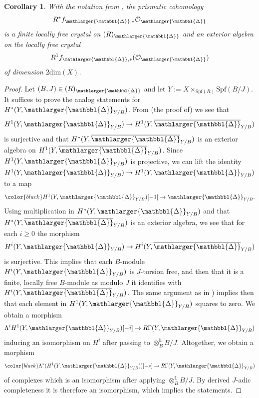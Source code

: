 \documentclass{amsart}
\newcommand{\prism}{{\mathlarger{\mathbbl{\Delta}}}}
\theoremstyle{plain}
\newtheorem{corollary}[theorem]{Corollary}
\theoremstyle{definition}
\newcommand{\Spf}{\mathrm{Spf}}
\newcommand{\red}[1]{{\color{black} #1}}
\newcommand{\blue}[1]{{\color{black}#1}}
\begin{document}
\begin{corollary}
  \label{sec:prism-dieud-modul-corollary-prismatic-cohomology-of-abelian-schemes} With the notation from ,
  the prismatic cohomology
  $$
  R^\ast f_{\prism,\ast}\mathcal{O}_\prism
  $$
  is a finite locally free crystal on $(R)_\prism$ and an exterior algebra on the locally free crystal
  $$
R^1f_{\prism,\ast}(\mathcal{O}_\prism)
$$
of dimension $2\mathrm{dim}(X)$.
  
\end{corollary}
\begin{proof}
  Let $(B,J)\in (R)_\prism$ and let $Y:=X\times_{\Spf(R)}\Spf(B/J)$. It suffices to prove the analog statements for $H^\ast(Y,\prism_{Y/B})$.
  From (the proof of)  we see that
  $$
  H^1(Y,\prism_{Y/B})\to H^1(Y,\overline{\prism}_{Y/B})
  $$
  is surjective and that $H^\ast(Y,\overline{\prism}_{Y/B})$ is an exterior algebra on $H^1(Y,\overline{\prism}_{Y/B})$. \blue{Since $H^1(Y,\prism_{Y/B})$ is projective, we can lift the identity $H^1(Y,\prism_{Y/B}) \to H^1(Y,\prism_{Y/B})$ to a map}
  $$
  \blue{H^1(Y,\prism_{Y/B})}[-1]\to \prism_{Y/B}.
  $$
  \red{Using multiplication in $H^\ast(Y,\prism_{Y/B})$ and that $H^\ast(Y,\overline{\prism}_{Y/B})$ is an exterior algebra, we see that for each $i\geq 0$ the morphism
    \[
      H^i(Y,\prism_{Y/B})\to H^i(Y,\overline{\prism}_{Y/B})
    \]
  is surjective. This implies that each $B$-module $H^i(Y,\prism_{Y/B})$ is $J$-torsion free, and then that it is a finite, locally free $B$-module as modulo $J$ it identifies with $H^i(Y,\overline{\prism}_{Y/B})$. The same argument \blue{as in \cite[Proposition 2.5.2.(ii)]{berthelot_breen_messing_theorie_de_dieudonne_cristalline_II})} implies then that each element in $H^1(Y,\prism_{Y/B})$ squares to zero.} \blue{We obtain a morphism
  $$
  \Lambda^i{H^1(Y,\prism_{Y/B})}[-i]\to R\Gamma(Y,\prism_{Y/B})
  $$}
  inducing an isomorphism on $H^i$ after passing to $\otimes^{\mathbb{L}}_{B}B/J$.
  Altogether, we obtain a morphism
  $$
  \blue{\Lambda^\ast(H^1(Y,\prism_{Y/B}))[-\ast]}\to R\Gamma(Y,\prism_{Y/B})
  $$
  of complexes which is an isomorphism after applying $\otimes^{\mathbb{L}}_BB/J$. By derived $J$-adic completeness it is therefore an isomorphism, which implies the statements.
 \end{proof}
\end{document}
